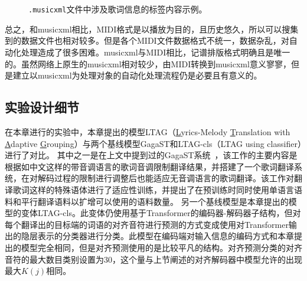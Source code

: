 \begin{figure}[ht]
    \centering
    \\
    \\
    \caption{\texttt{.musicxml}文件中涉及歌词信息的标签内容示例。}
\end{figure}
总之，和musicxml相比，MIDI格式是以播放为目的，且历史悠久，所以可以搜集到的数据文件也相对较多。但是各个MIDI文件数据格式不统一，数据杂乱，对自动化处理造成了很多困难。musicxml与MIDI相比，记谱排版格式明确且是唯一的。虽然网络上原生的musicxml相对较少，由MIDI转换到musicxml意义寥寥，但是建立以musicxml为处理对象的自动化处理流程仍是必要且有意义的。
\subsection{实验设计细节}
在本章进行的实验中，本章提出的模型LTAG（\underline{L}yrics-Melody \underline{T}ranslation with
\underline{A}daptive \underline{G}rouping）与两个基线模型GagaST和LTAG-cls（LTAG using classifier）进行了对比。
其中之一是在上文中提到过的GagaST系统~\cite{gagast}，该工作的主要内容是根据如中文这样的带音调语言的歌词音调限制翻译结果，并搭建了一个歌词翻译系统，在对解码过程的限制进行调整后也能适应无音调语言的歌词翻译。该工作对翻译歌词这样的特殊语体进行了适应性训练，并提出了在预训练时同时使用单语言语料和平行翻译语料以扩增可以使用的语料数量。
另一个基线模型是本章提出的模型的变体LTAG-cls。此变体仍使用基于Transformer的编码器-解码器子结构，但对每个翻译出的目标端的词语的对齐音符进行预测的方式变成使用对Transformer输出的隐层表示的分类器进行分类。此模型在编码端对输入信息的编码方式和本章提出的模型完全相同，但是对齐预测使用的是比较平凡的结构。对齐预测分类的对齐音符的最大数目类别设置为30，这个量与上节阐述的对齐解码器中模型允许的出现最大$K(j)$相同。

